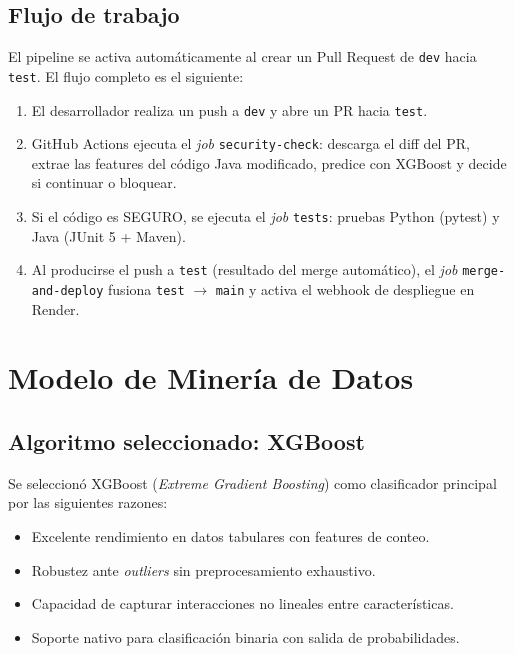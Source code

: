 \documentclass[12pt,a4paper]{article}
\begin{document}
\subsection{Flujo de trabajo}

El pipeline se activa automáticamente al crear un Pull Request de \texttt{dev} hacia \texttt{test}. El flujo completo es el siguiente:

\begin{enumerate}
  \item El desarrollador realiza un push a \texttt{dev} y abre un PR hacia \texttt{test}.
  \item GitHub Actions ejecuta el \textit{job} \texttt{security-check}: descarga el diff del PR, extrae las features del código Java modificado, predice con XGBoost y decide si continuar o bloquear.
  \item Si el código es SEGURO, se ejecuta el \textit{job} \texttt{tests}: pruebas Python (pytest) y Java (JUnit 5 + Maven).
  \item Al producirse el push a \texttt{test} (resultado del merge automático), el \textit{job} \texttt{merge-and-deploy} fusiona \texttt{test} $\to$ \texttt{main} y activa el webhook de despliegue en Render.
\end{enumerate}

\section{Modelo de Minería de Datos}

\subsection{Algoritmo seleccionado: XGBoost}

Se seleccionó XGBoost (\textit{Extreme Gradient Boosting}) como clasificador principal por las siguientes razones:

\begin{itemize}
  \item Excelente rendimiento en datos tabulares con features de conteo.
  \item Robustez ante \textit{outliers} sin preprocesamiento exhaustivo.
  \item Capacidad de capturar interacciones no lineales entre características.
  \item Soporte nativo para clasificación binaria con salida de probabilidades.
\end{itemize}
\end{document}
